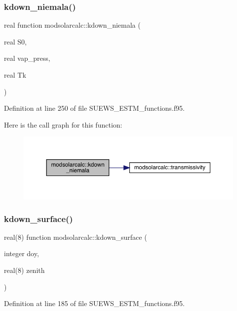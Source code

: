 \subsubsection{\texorpdfstring{kdown\+\_\+niemala()}{kdown\_niemala()}}
{\footnotesize\ttfamily real function modsolarcalc\+::kdown\+\_\+niemala (\begin{DoxyParamCaption}\item[{real}]{S0,  }\item[{real}]{vap\+\_\+press,  }\item[{real}]{Tk }\end{DoxyParamCaption})}



Definition at line 250 of file S\+U\+E\+W\+S\+\_\+\+E\+S\+T\+M\+\_\+functions.\+f95.

Here is the call graph for this function\+:\nopagebreak
\begin{figure}[H]
\begin{center}
\leavevmode
\includegraphics[width=350pt]{namespacemodsolarcalc_aaddec454c9882fef35b57ee1fa6206b2_cgraph}
\end{center}
\end{figure}
\mbox{\label{namespacemodsolarcalc_af8c3c752c506d880efae84070a189a71}} 
\subsubsection{\texorpdfstring{kdown\+\_\+surface()}{kdown\_surface()}}
{\footnotesize\ttfamily real(8) function modsolarcalc\+::kdown\+\_\+surface (\begin{DoxyParamCaption}\item[{integer}]{doy,  }\item[{real(8)}]{zenith }\end{DoxyParamCaption})}



Definition at line 185 of file S\+U\+E\+W\+S\+\_\+\+E\+S\+T\+M\+\_\+functions.\+f95.

